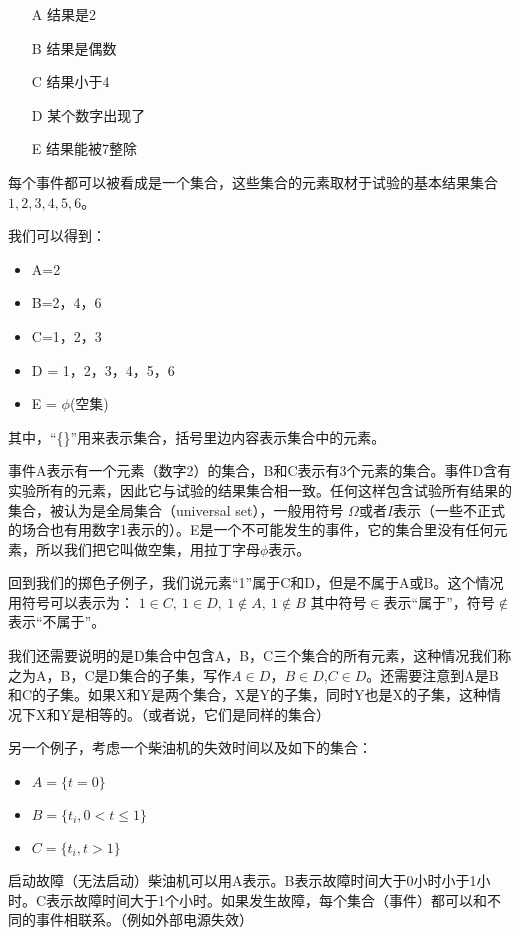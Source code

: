 \documentclass[cn,11pt,chinese]{elegantbook}
\begin{document}
\begin{itemize}
	\item[A] 结果是2
\item[B] 结果是偶数
\item[C] 结果小于4
 \item[D]某个数字出现了
 \item[E]结果能被7整除
\end{itemize}

每个事件都可以被看成是一个集合，这些集合的元素取材于试验的基本结果集合${1,2,3,4,5,6}$。

我们可以得到：

\begin{itemize}
	\item A={2}
 \item B={2，4，6}
 \item C={1，2，3}
 \item D = {1，2，3，4，5，6}
 \item E = $\phi$(空集)
\end{itemize}

其中，“\{\}”用来表示集合，括号里边内容表示集合中的元素。

事件A表示有一个元素（数字2）的集合，B和C表示有3个元素的集合。事件D含有实验所有的元素，因此它与试验的结果集合相一致。任何这样包含试验所有结果的集合，被认为是全局集合（universal set），一般用符号 $\Omega $或者$I$表示（一些不正式的场合也有用数字1表示的）。E是一个不可能发生的事件，它的集合里没有任何元素，所以我们把它叫做空集，用拉丁字母$\phi$表示。

回到我们的掷色子例子，我们说元素“1”属于C和D，但是不属于A或B。这个情况用符号可以表示为：
$1\in C,\ 1 \in D, \ 1\notin A , \ 1 \notin B$
其中符号$\in$表示“属于”，符号$\notin$表示“不属于”。

我们还需要说明的是D集合中包含A，B，C三个集合的所有元素，这种情况我们称之为A，B，C是D集合的子集，写作$A \in D$，$B \in D$,$C \in D$。还需要注意到A是B和C的子集。如果X和Y是两个集合，X是Y的子集，同时Y也是X的子集，这种情况下X和Y是相等的。（或者说，它们是同样的集合）

另一个例子，考虑一个柴油机的失效时间以及如下的集合：

\begin{itemize}
	\item $A = \{t = 0\}$
\item $B = \{t_i,0<t\leq 1\}$
\item $C = \{t_i,t>1\}$
\end{itemize}

启动故障（无法启动）柴油机可以用A表示。B表示故障时间大于0小时小于1小时。C表示故障时间大于1个小时。如果发生故障，每个集合（事件）都可以和不同的事件相联系。（例如外部电源失效）
\end{document}
